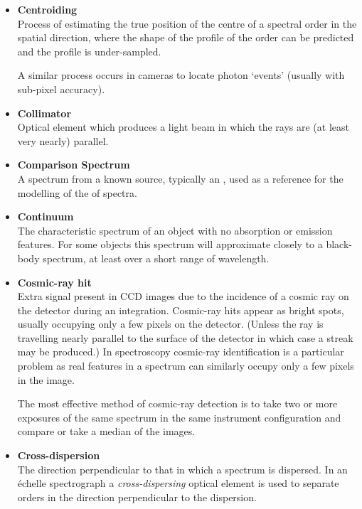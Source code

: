 \documentclass[twoside,11pt]{starlink}
\begin{document}
\begin{itemize}
\item {\bf\label{gl_centroiding}Centroiding}\\
      Process of estimating the true position of the centre of a spectral
      order in the spatial direction, where the shape of the profile of
      the order can be predicted and the profile is under-sampled.

      A similar process occurs in  cameras to locate
      photon `events' (usually with sub-pixel accuracy).

\item {\bf\label{gl_collimator}Collimator}\\
      Optical element which produces a light beam in which the rays
      are (at least very nearly) parallel.

\item {\bf\label{gl_comparison}Comparison Spectrum}\\
      A spectrum from a known source, typically an ,
      used as a reference for the modelling of the
       of spectra.

\item {\bf\label{gl_continuum}Continuum}\\
      The characteristic spectrum of an object with no absorption or
      emission features.  For some objects this spectrum will approximate
      closely to a black-body spectrum, at least over a short range of
      wavelength.

\item {\bf\label{gl_cosmic_ray}Cosmic-ray hit}\\
      Extra signal present in CCD images due to the incidence of a cosmic
      ray on the detector during an integration.  Cosmic-ray hits appear
      as bright spots, usually occupying only a few pixels on the detector.
      (Unless the ray is travelling nearly parallel to the surface of the
      detector in which case a streak may be produced.)
      In spectroscopy cosmic-ray identification is a particular problem
      as real features in a spectrum can similarly occupy only a few pixels
      in the image.

      The most effective method of cosmic-ray detection is to take
      two or more exposures of the same spectrum in the same instrument
      configuration and compare or take a median of the images.

\item {\bf\label{gl_cross_dispersion}Cross-dispersion}\\
      The direction perpendicular to that in which a spectrum is
      dispersed.  In an \'{e}chelle spectrograph a {\sl cross-dispersing}
      optical element is used to separate orders in the
      direction perpendicular to the dispersion.


\end{itemize}
\end{document}
